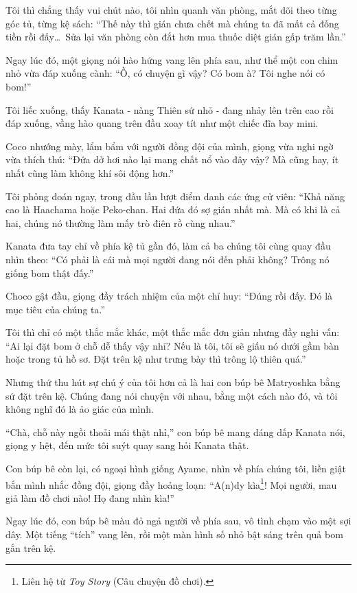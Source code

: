 \documentclass[../main.tex]{subfiles}
\begin{document}
Tôi thì chẳng thấy vui chút nào, tôi nhìn quanh văn phòng, mắt dõi theo từng góc tủ, từng kệ sách: ``Thế này thì gián chưa chết mà chúng ta đã mất cả đống tiền rồi đấy\dots\ Sửa lại văn phòng còn đắt hơn mua thuốc diệt gián gấp trăm lần.''

Ngay lúc đó, một giọng nói hào hứng vang lên phía sau, như thể một con chim nhỏ vừa đáp xuống cành: ``Ồ, có chuyện gì vậy? Có bom à? Tôi nghe nói có bom!''

Tôi liếc xuống, thấy Kanata - nàng Thiên sứ nhỏ - đang nhảy lên trên cao rồi đáp xuống, vầng hào quang trên đầu xoay tít như một chiếc đĩa bay mini.


Coco nhướng mày, lẩm bẩm với người đồng đội của mình, giọng vừa nghi ngờ vừa thích thú: ``Đứa dở hơi nào lại mang chất nổ vào đây vậy? Mà cũng hay, ít nhất cũng làm không khí sôi động hơn.''

Tôi phỏng đoán ngay, trong đầu lần lượt điểm danh các ứng cử viên: ``Khả năng cao là Haachama hoặc Peko-chan. Hai đứa đó sợ gián nhất mà. Mà có khi là cả hai, chúng nó thường làm mấy trò điên rồ cùng nhau.''

Kanata đưa tay chỉ về phía kệ tủ gần đó, làm cả ba chúng tôi cùng quay đầu nhìn theo: ``Có phải là cái mà mọi người đang nói đến phải không? Trông nó giống bom thật đấy.''

Choco gật đầu, giọng đầy trách nhiệm của một chỉ huy: ``Đúng rồi đấy. Đó là mục tiêu của chúng ta.''

Tôi thì chỉ có một thắc mắc khác, một thắc mắc đơn giản nhưng đầy nghi vấn: ``Ai lại đặt bom ở chỗ dễ thấy vậy nhỉ? Nếu là tôi, tôi sẽ giấu nó dưới gầm bàn hoặc trong tủ hồ sơ. Đặt trên kệ như trưng bày thì trông lộ thiên quá.''

Nhưng thứ thu hút sự chú ý của tôi hơn cả là hai con búp bê Matryoshka bằng sứ đặt trên kệ. Chúng đang nói chuyện với nhau, bằng một cách nào đó, và tôi không nghĩ đó là ảo giác của mình.


``Chà, chỗ này ngồi thoải mái thật nhỉ,''  con búp bê mang dáng dấp Kanata nói, giọng y hệt, đến mức tôi suýt quay sang hỏi Kanata thật.

Con búp bê còn lại, có ngoại hình giống Ayame, nhìn về phía chúng tôi, liền giật bắn mình nhắc đồng đội, giọng đầy hoảng loạn: ``A(n)dy kìa\footnote{Liên hệ từ \textit{Toy Story} (Câu chuyện đồ chơi).}! Mọi người, mau giả làm đồ chơi nào! Họ đang nhìn kìa!''

Ngay lúc đó, con búp bê màu đỏ ngả người về phía sau, vô tình chạm vào một sợi dây. Một tiếng ``tích'' vang lên, rồi một màn hình số nhỏ bật sáng trên quả bom gắn trên kệ.
\end{document}
